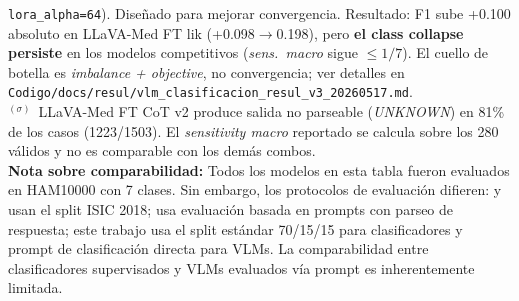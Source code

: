\begin{table}[htbp]
\begin{minipage}{\textwidth}
  \texttt{lora\_alpha=64}). Diseñado para mejorar convergencia. Resultado: F1 sube +0.100 absoluto
  en LLaVA-Med FT lik (+0.098$\to$0.198), pero \textbf{el class collapse persiste} en los modelos
  competitivos (\textit{sens.\ macro} sigue $\le 1/7$). El cuello de botella es \textit{imbalance + objective},
  no convergencia; ver detalles en \texttt{Codigo/docs/resul/vlm\_clasificacion\_resul\_v3\_20260517.md}.\\[4pt]
  $^{(\sigma)}$~LLaVA-Med FT CoT v2 produce salida no parseable (\textit{UNKNOWN}) en 81\% de los casos
  (1223/1503). El \textit{sensitivity macro} reportado se calcula sobre los 280 válidos y no es
  comparable con los demás combos.\\[4pt]
  \textbf{Nota sobre comparabilidad:}
  Todos los modelos en esta tabla fueron evaluados en HAM10000 con 7 clases.
  Sin embargo, los protocolos de evaluación difieren:
  \cite{SkinHealthMate2024} y~\cite{SkinSavvy22025} usan el split ISIC 2018;
  \cite{SkinR12025} usa evaluación basada en prompts con parseo de respuesta;
  este trabajo usa el split estándar 70/15/15 para clasificadores y prompt
  de clasificación directa para VLMs.
  La comparabilidad entre clasificadores supervisados y VLMs evaluados
  vía prompt es inherentemente limitada.
\end{minipage}
\end{table}


